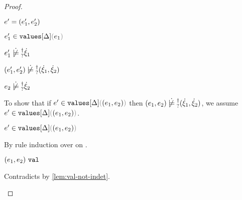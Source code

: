 \begin{proof}
\begin{byCases}
\begin{byCases}
\begin{byCases}
\begin{byCases}
\begin{byCases}
\begin{byCases}
              \item[\text{(\ref{rule:IVPair})}]
              \begin{pfsteps*}
              \item $e'=(e_1' , e_2')$ 
              \item $\inValues{e_1'}{\Delta}{e_1}$  
              \item $\cnotsatisfyormay{e_1'}{\hxi_1}$  
              \item $\cnotsatisfyormay{\hpair{e_1'}{e_2'}}{\cpair{\hxi_1}{\hxi_2}}$ 
              \end{pfsteps*} 
            \end{byCases}
          \end{byCases}
          \item[\cnotsatisfyormay{e_2}{\hxi_2}]
          \begin{pfsteps*}
          \item $\cnotsatisfyormay{e_2}{\hxi_2}$  
          \end{pfsteps*}
          To show that if $\inValues{e'}{\Delta}{\hpair{e_1}{e_2}}$ then $\cnotsatisfyormay{\hpair{e_1}{e_2}}{\cpair{\hxi_1}{\hxi_2}}$, we assume $\inValues{e'}{\Delta}{\hpair{e_1}{e_2}}$.
          \begin{pfsteps*}
          \item $\inValues{e'}{\Delta}{\hpair{e_1}{e_2}}$  
          \end{pfsteps*}
          By rule induction over  on .
          \begin{byCases}
            \item[\text{(\ref{rule:IVVal})}]
            \begin{pfsteps*}
            \item $(e_1 , e_2) ~\mathtt{val}$ 
            \end{pfsteps*} 
            Contradicts  by \autoref{lem:val-not-indet}.
            \item[\text{(\ref{rule:IVIndet})}] 
            \begin{pfsteps*}

\end{pfsteps*}
\end{byCases}
\end{byCases}
\end{byCases}
\end{byCases}
\end{byCases}
\end{proof}
